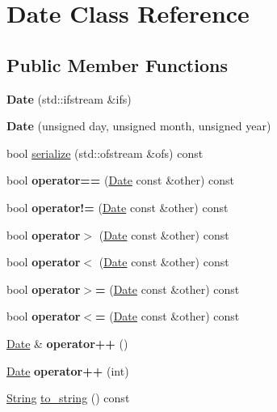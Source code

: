 \hypertarget{classDate}{}\section{Date Class Reference}
\label{classDate}
\subsection*{Public Member Functions}
\begin{DoxyCompactItemize}
\item 
\mbox{\label{classDate_a5e72c9e6a4e666e260e989c2fd16beaf}} 
{\bfseries Date} (std\+::ifstream \&ifs)
\item 
\mbox{\label{classDate_a6e4979dfc71c09cdab0b65a734e4a4df}} 
{\bfseries Date} (unsigned day, unsigned month, unsigned year)
\item 
bool \hyperlink{classDate_aaa7c624e382fff1ba3438cb46232c05e}{serialize} (std\+::ofstream \&ofs) const
\item 
\mbox{\label{classDate_a0b4650e6e69f6ab4816ee480b0ae2737}} 
bool {\bfseries operator==} (\hyperlink{classDate}{Date} const \&other) const
\item 
\mbox{\label{classDate_a8b7030515e10d7d79f187165463a3315}} 
bool {\bfseries operator!=} (\hyperlink{classDate}{Date} const \&other) const
\item 
\mbox{\label{classDate_a52d36d1aa6868b5afa178bd495714e44}} 
bool {\bfseries operator$>$} (\hyperlink{classDate}{Date} const \&other) const
\item 
\mbox{\label{classDate_a074316aeb377c6c1ea828b2642b39153}} 
bool {\bfseries operator$<$} (\hyperlink{classDate}{Date} const \&other) const
\item 
\mbox{\label{classDate_ac1bca91434bf336beb5372ee4a2ca46f}} 
bool {\bfseries operator$>$=} (\hyperlink{classDate}{Date} const \&other) const
\item 
\mbox{\label{classDate_a01c66a5f355ed676a1ee8effb78af222}} 
bool {\bfseries operator$<$=} (\hyperlink{classDate}{Date} const \&other) const
\item 
\mbox{\label{classDate_a3993e645e3408e07d12b70e58f36630c}} 
\hyperlink{classDate}{Date} \& {\bfseries operator++} ()
\item 
\mbox{\label{classDate_a63f7060a7a7997e289e5e885f84557e5}} 
\hyperlink{classDate}{Date} {\bfseries operator++} (int)
\item 
\hyperlink{classString}{String} \hyperlink{classDate_a4d4dfda9dfa34c87e06381254bfe5151}{to\+\_\+string} () const
\end{DoxyCompactItemize}
